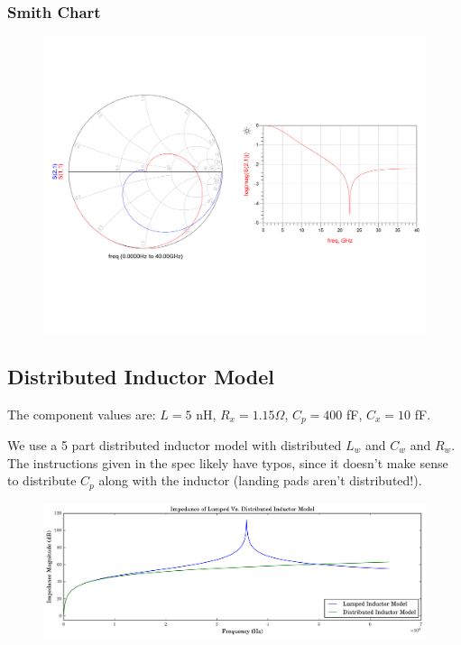 \documentclass[11pt]{article}
\begin{document}
\subsubsection{Smith Chart}
\begin{figure}[H]
	\centering \includegraphics[width=\textwidth]{images/inductor_smith.png}
\end{figure}

\subsection{Distributed Inductor Model}
The component values are: $L = 5$ nH, $R_{x} = 1.15\Omega$, $C_{p} = 400$ fF, $C_{x} = 10$ fF.

We use a 5 part distributed inductor model with distributed $L_{w}$ and $C_{w}$ and $R_{w}$. The instructions given in the spec likely have typos, since it doesn't make sense to distribute $C_p$ along with the inductor (landing pads aren't distributed!).

\begin{figure}[H]
	\centering \includegraphics[width=\textwidth]{images/inductor_distr_impedance.png}
\end{figure}
\end{document}
